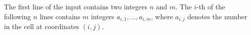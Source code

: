 The first line of the input contains two integers $n$ and $m$.
The $i$-th of the following $n$ lines contains $m$ integers $a_{i,1},\ldots,a_{i, m}$,
where $a_{i,j}$ denotes the number in the cell at coordinates $(i,j)$.
